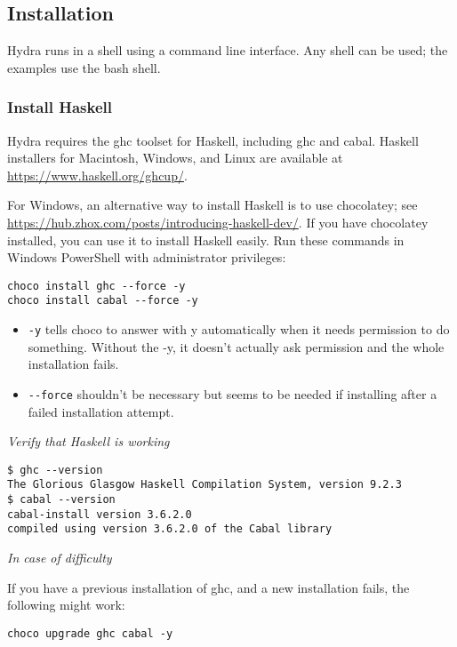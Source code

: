 \documentclass[11pt]{article}
\begin{document}
\subsection{Installation}
\label{sec:org2396668}

Hydra runs in a shell using a command line interface.  Any shell can
be used; the examples use the bash shell.

\subsubsection{Install Haskell}
\label{sec:org09d3e30}

Hydra requires the ghc toolset for Haskell, including ghc and cabal.
Haskell installers for Macintosh, Windows, and Linux are available at
\url{https://www.haskell.org/ghcup/}.

For Windows, an alternative way to install Haskell is to use
chocolatey; see \url{https://hub.zhox.com/posts/introducing-haskell-dev/}.
If you have chocolatey installed, you can use it to install Haskell
easily.  Run these commands in Windows PowerShell with administrator
privileges:

\begin{verbatim}
choco install ghc --force -y
choco install cabal --force -y
\end{verbatim}

\begin{itemize}
\item \texttt{-y} tells choco to answer with y automatically when it needs
permission to do something.  Without the -y, it doesn't actually ask
permission and the whole installation fails.
\item \texttt{-{}-{}force} shouldn't be necessary but seems to be needed if
installing after a failed installation attempt.
\end{itemize}

\emph{Verify that Haskell is working}

\begin{verbatim}
$ ghc --version
The Glorious Glasgow Haskell Compilation System, version 9.2.3
$ cabal --version
cabal-install version 3.6.2.0
compiled using version 3.6.2.0 of the Cabal library
\end{verbatim}

\emph{In case of difficulty}

If you have a previous installation of ghc, and a new installation
fails, the following might work:

\begin{verbatim}
choco upgrade ghc cabal -y
\end{verbatim}
\end{document}
